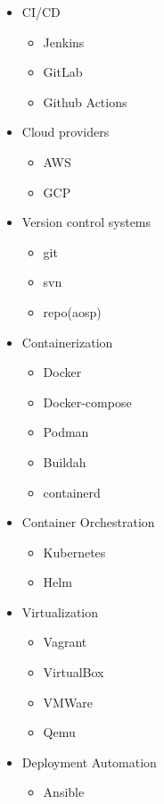 \begin{itemize}
    \item CI/CD
    \begin{itemize}
        \item Jenkins
        \item GitLab
        \item Github Actions
    \end{itemize}

    \item Cloud providers
    \begin{itemize}
        \item AWS
        \item GCP
    \end{itemize}

    \item Version control systems
    \begin{itemize}
        \item git
        \item svn
        \item repo(aosp)
    \end{itemize}

    \item Containerization
    \begin{itemize}
        \item Docker
        \item Docker-compose
        \item Podman
        \item Buildah
        \item containerd
    \end{itemize}

    \item Container Orchestration
    \begin{itemize}
        \item Kubernetes
        \item Helm
    \end{itemize}

    \item Virtualization
    \begin{itemize}
        \item Vagrant
        \item VirtualBox
        \item VMWare
        \item Qemu
    \end{itemize}

    \item Deployment Automation
    \begin{itemize}
        \item Ansible
    \end{itemize}


\end{itemize}
